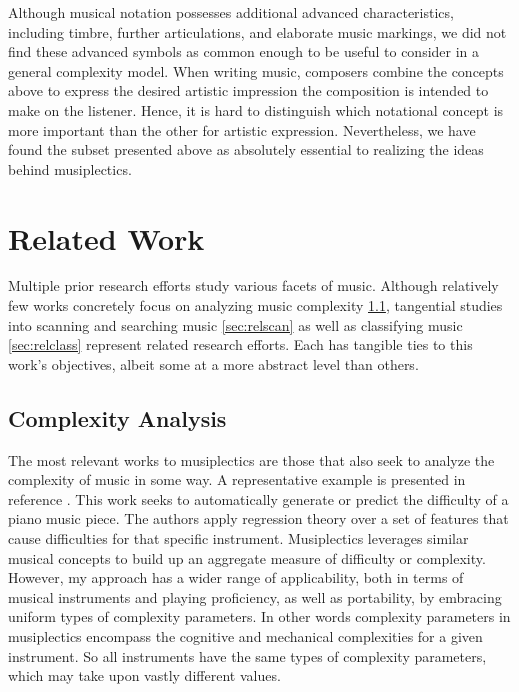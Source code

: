 \documentclass[12pt]{report}
\begin{document}
Although musical notation possesses additional advanced characteristics, including timbre, further articulations, and elaborate music markings, we did not find these advanced symbols as common enough to be useful to consider in a general complexity model. When writing music, composers combine the concepts above to express the desired artistic impression the composition is intended to make on the listener. Hence, it is hard to distinguish which notational concept is more important than the other for artistic expression. Nevertheless, we have found the subset presented above as absolutely essential to realizing the ideas behind musiplectics.

\chapter{Related Work} 
\label{sec:related}

Multiple prior research efforts study various facets of music. Although relatively few works concretely focus on analyzing music complexity \ref{sec:relcom}, tangential studies into scanning and searching music \ref{sec:relscan} as well as classifying music \ref{sec:relclass} represent related research efforts. Each has tangible ties to this work's objectives, albeit some at a more abstract level than others.


\section{Complexity Analysis}
\label{sec:relcom}

The most relevant works to musiplectics are those that also seek to analyze the complexity of music in some way. A representative example is presented in reference \cite{Chiu2012}. This work seeks to automatically generate or predict the difficulty of a piano music piece. The authors apply regression theory over a set of features that cause difficulties for that specific instrument. Musiplectics leverages similar musical concepts to build up an aggregate measure of difficulty or complexity. However, my approach has a wider range of applicability, both in terms of musical instruments and playing proficiency, as well as portability, by embracing uniform types of complexity parameters. In other words complexity parameters in musiplectics encompass the cognitive and mechanical complexities for a given instrument. So all instruments have the same types of complexity parameters, which may take upon vastly different values.
\end{document}
